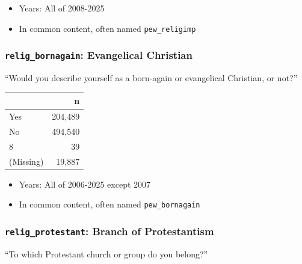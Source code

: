 \documentclass[10pt,article,oneside]{memoir}
\begin{document}
\begin{itemize}
\tightlist
\item
  Years: All of 2008-2025
\item
  In common content, often named \texttt{pew\_religimp}
\end{itemize}

\subsubsection{\texorpdfstring{\texttt{relig\_bornagain}: Evangelical
Christian}{relig\_bornagain: Evangelical Christian}}\label{relig_bornagain-evangelical-christian}

``Would you describe yourself as a born-again or evangelical Christian,
or not?''

\begin{table}[H]
\centering
\begin{tabular}[t]{lr}
\toprule
 & n\\
\midrule
Yes & 204,489\\
No & 494,540\\
8 & 39\\
(Missing) & 19,887\\
\bottomrule
\end{tabular}
\end{table}

\begin{itemize}
\tightlist
\item
  Years: All of 2006-2025 except 2007
\item
  In common content, often named \texttt{pew\_bornagain}
\end{itemize}

\subsubsection{\texorpdfstring{\texttt{relig\_protestant}: Branch of
Protestantism}{relig\_protestant: Branch of Protestantism}}\label{relig_protestant-branch-of-protestantism}

``To which Protestant church or group do you belong?''
\end{document}
